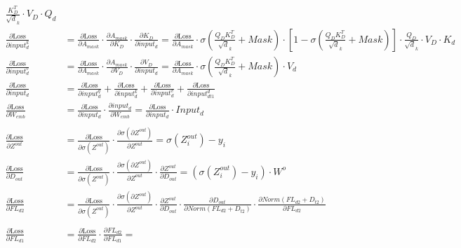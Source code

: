 \documentclass[12pt,letterpaper]{article}
\begin{document}
\begin{align*}
\frac{ K_{D}^T}{\sqrt d_k} \cdot V_{D} \cdot Q_d
\\
\frac{\partial \text{Loss}}{\partial input^k_d} &= %
\frac{\partial \text{Loss}}{\partial A_{mask}}\cdot
\frac{\partial A_{mask}}{\partial K_{D}} \cdot
\frac{\partial K_{D}}{\partial input_d}=
\frac{\partial \text{Loss}}{\partial A_{mask}} \cdot 
\sigma( \frac{Q_{D} K_{D}^T}{\sqrt d_k}+Mask)\cdot \left[1-\sigma( \frac{Q_{D} K_{D}^T}{\sqrt d_k}+Mask)\right]\cdot 
\frac{ Q_{D}}{\sqrt d_k} \cdot V_{D} \cdot K_d
\\
\frac{\partial \text{Loss}}{\partial input^v_d} &= %
\frac{\partial \text{Loss}}{\partial A_{mask}}\cdot
\frac{\partial A_{mask}}{\partial V_{D}} \cdot
\frac{\partial V_{D}}{\partial input_d}=
\frac{\partial \text{Loss}}{\partial A_{mask}} \cdot 
\sigma( \frac{Q_{D} K_{D}^T}{\sqrt d_k}+Mask)\cdot V_d
\\
\frac{\partial \text{Loss}}{\partial input_d} &= %
\frac{\partial \text{Loss}}{\partial input^q_d}+
\frac{\partial \text{Loss}}{\partial input^k_d}+
\frac{\partial \text{Loss}}{\partial input^v_d}+
\frac{\partial \text{Loss}}{\partial input^d_{dt1}}
\\
\frac{\partial \text{Loss}}{\partial W_{emb}} &= %
\frac{\partial \text{Loss}}{\partial input_d} \cdot
\frac{\partial input_d}{\partial W_{emb}}=
\frac{\partial \text{Loss}}{\partial input_d} \cdot
Input_d
\\\\
\frac{\partial \text{Loss}}{\partial Z^{out}} &= \frac{\partial \text{Loss}}{\partial \sigma(Z^{out})} \cdot \frac{\partial \sigma(\partial Z^{out})}{\partial Z^{out}} = \sigma(Z^{out}_i) - y_i \\
\frac{\partial \text{Loss}}{\partial D_{out}} &= \frac{\partial \text{Loss}}{\partial \sigma(Z^{out})} \cdot \frac{\partial \sigma(\partial Z^{out})}{\partial Z^{out}} \cdot \frac{\partial Z^{out}}{\partial D_{out}} = (\sigma(Z^{out}_i) - y_i) \cdot W^o\\
\frac{\partial \text{Loss}}{\partial FL_{d2}} &= \frac{\partial \text{Loss}}{\partial \sigma(Z^{out})} \cdot 
\frac{\partial \sigma(\partial Z^{out})}{\partial Z^{out}} \cdot 
\frac{\partial Z^{out}}{\partial D_{out}} \cdot
\frac{\partial D_{out}}{\partial Norm(FL_{d2}+D_{t2})}\cdot 
\frac{\partial Norm(FL_{d2}+D_{t2})}{\partial FL_{d2}}
\\\\
\frac{\partial \text{Loss}}{\partial FL_{d1}} &= %
\frac{\partial \text{Loss}}{\partial FL_{d2}} \cdot 
\frac{\partial FL_{d2}}{\partial FL_{d1}}=

\end{align*}
\end{document}
